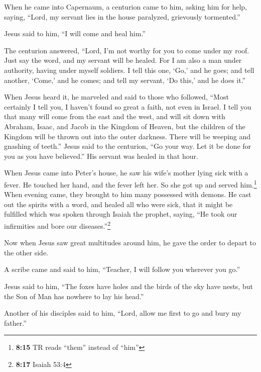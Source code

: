  When he came into Capernaum, a centurion came to him,
asking him for help,  saying, ``Lord, my servant lies in
the house paralyzed, grievously tormented.''

 Jesus said to him, ``I will come and heal him.''

 The centurion answered, ``Lord, I'm not worthy for you to
come under my roof. Just say the word, and my servant will be healed.
 For I am also a man under authority, having under myself
soldiers. I tell this one, `Go,' and he goes; and tell another, `Come,'
and he comes; and tell my servant, `Do this,' and he does it.''

 When Jesus heard it, he marveled and said to those who
followed, ``Most certainly I tell you, I haven't found so great a faith,
not even in Israel.  I tell you that many will come from
the east and the west, and will sit down with Abraham, Isaac, and Jacob
in the Kingdom of Heaven,  but the children of the
Kingdom will be thrown out into the outer darkness. There will be
weeping and gnashing of teeth.''  Jesus said to the
centurion, ``Go your way. Let it be done for you as you have believed.''
His servant was healed in that hour.

 When Jesus came into Peter's house, he saw his wife's
mother lying sick with a fever.  He touched her hand, and
the fever left her. So she got up and served him.\footnote{\textbf{8:15}
  TR reads ``them'' instead of ``him''}  When evening
came, they brought to him many possessed with demons. He cast out the
spirits with a word, and healed all who were sick,  that
it might be fulfilled which was spoken through Isaiah the prophet,
saying, ``He took our infirmities and bore our diseases.''\footnote{\textbf{8:17}
  Isaiah 53:4}

 Now when Jesus saw great multitudes around him, he gave
the order to depart to the other side.

 A scribe came and said to him, ``Teacher, I will follow
you wherever you go.''

 Jesus said to him, ``The foxes have holes and the birds
of the sky have nests, but the Son of Man has nowhere to lay his head.''

 Another of his disciples said to him, ``Lord, allow me
first to go and bury my father.''

